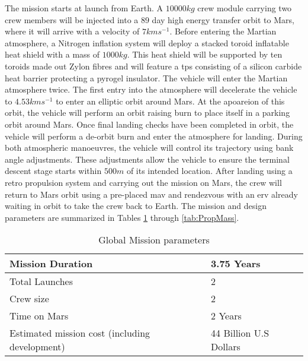 The mission starts at launch from Earth. A $10000 kg$ crew module carrying two crew members will be injected into a $89$ day high energy transfer orbit to Mars, where it will arrive with a velocity of $7 kms^{-1}$. Before entering the Martian atmosphere, a Nitrogen inflation system will deploy a stacked toroid inflatable heat shield with a mass of $1000 kg$. This heat shield will be supported by ten toroids made out Zylon fibres and will feature a \gls{tps} consisting of a silicon carbide heat barrier protecting a pyrogel insulator. The vehicle will enter the Martian atmosphere twice. The first entry into the atmosphere will decelerate the vehicle to $4.53 kms^{-1}$ to enter an elliptic orbit around Mars. At the apoareion of this orbit, the vehicle will perform an orbit raising burn to place itself in a parking orbit around Mars. Once final landing checks have been completed in orbit, the vehicle will perform a de-orbit burn and enter the atmosphere for landing. During both atmospheric manoeuvres, the vehicle will control its trajectory using bank angle adjustments. These adjustments allow the vehicle to ensure the terminal descent stage starts within $500m$ of its intended location. After landing using a retro propulsion system and carrying out the mission on Mars, the crew will return to Mars orbit using a pre-placed \gls{mav} and rendezvous with an \gls{erv} already waiting in orbit to take the crew back to Earth. The mission and design parameters are summarized in Tables \ref{tab:MissionPar} through \ref{tab:PropMass}.


\begin{table}
	\centering
	\caption{Global Mission parameters}
	\label{tab:MissionPar}
	\begin{tabular}{|l|l|} \hline
		Mission Duration				             	& 	3.75 Years						\\ \hline 
		Total Launches       							&	2  		   	  					\\ \hline
		Crew size				 						&	2     	  						\\ \hline
		Time on Mars				              	   	&  	2 Years    						\\ \hline
		Estimated mission cost (including development) 	&  	44 Billion U.S Dollars			\\ \hline
	\end{tabular}
\end{table}

